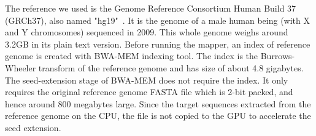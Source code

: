 The reference we used is the Genome Reference Consortium Human Build 37 (GRCh37), also named "hg19"~\cite{ncbi:hg19}. It is the genome of a male human being (with X and Y chromosomes) sequenced in 2009. This whole genome weighs around 3.2GB in its plain text version. Before running the mapper, an index of reference genome is created with BWA-MEM indexing tool. The index is the Burrows-Wheeler transform of the reference genome and has size of about 4.8 gigabytes. The seed-extension stage of BWA-MEM does not require the index. It only requires the original reference genome FASTA file which is 2-bit packed, and hence around 800 megabytes large. Since the target sequences extracted from the reference genome on the CPU, the file is not copied to the GPU to accelerate the seed extension.


